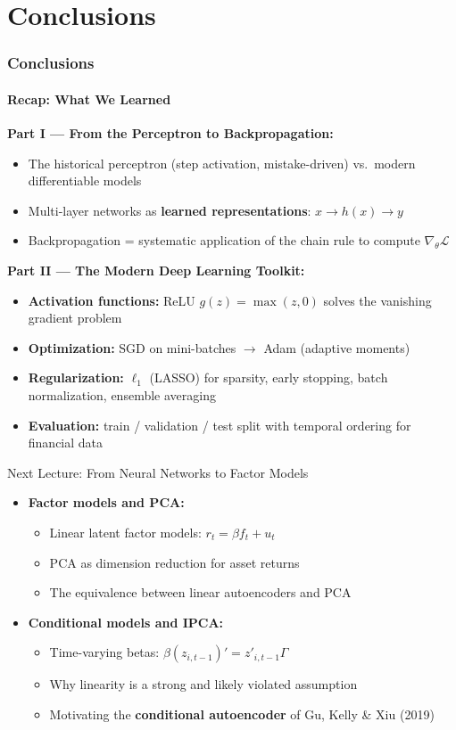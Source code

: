 \documentclass[aspectratio=169]{beamer}
\begin{document}
\section{Conclusions}
%
\begin{frame}
\frametitle{Conclusions}
\framesubtitle{Recap: What We Learned}

\textbf{Part I --- From the Perceptron to Backpropagation:}
\begin{itemize}
    \item The historical perceptron (step activation, mistake-driven) vs.\ modern differentiable models
    \item Multi-layer networks as \textbf{learned representations}: $x \to h(x) \to y$
    \item Backpropagation = systematic application of the chain rule to compute $\nabla_\theta \mathcal{L}$
\end{itemize}

\medskip
\textbf{Part II --- The Modern Deep Learning Toolkit:}
\begin{itemize}
    \item \textbf{Activation functions:} ReLU $g(z) = \max(z,0)$ solves the vanishing gradient problem
    \item \textbf{Optimization:} SGD on mini-batches $\to$ Adam (adaptive moments)
    \item \textbf{Regularization:} $\ell_1$ (LASSO) for sparsity, early stopping, batch normalization, ensemble averaging
    \item \textbf{Evaluation:} train / validation / test split with temporal ordering for financial data
\end{itemize}

\end{frame}
%
%
\begin{frame}{Next Lecture: From Neural Networks to Factor Models}
\begin{itemize}
    \item \textbf{Factor models and PCA:}
    \begin{itemize}
    	\normalsize
        \item Linear latent factor models: $r_t = \beta f_t + u_t$
        \item PCA as dimension reduction for asset returns
        \item The equivalence between linear autoencoders and PCA
    \end{itemize}
    \item \textbf{Conditional models and IPCA:}
    \begin{itemize}
    	\normalsize
        \item Time-varying betas: $\beta(z_{i,t-1})' = z'_{i,t-1}\Gamma$
        \item Why linearity is a strong and likely violated assumption
        \item Motivating the \textbf{conditional autoencoder} of Gu, Kelly \& Xiu (2019)
    \end{itemize}
\end{itemize}
\end{frame}
\end{document}
